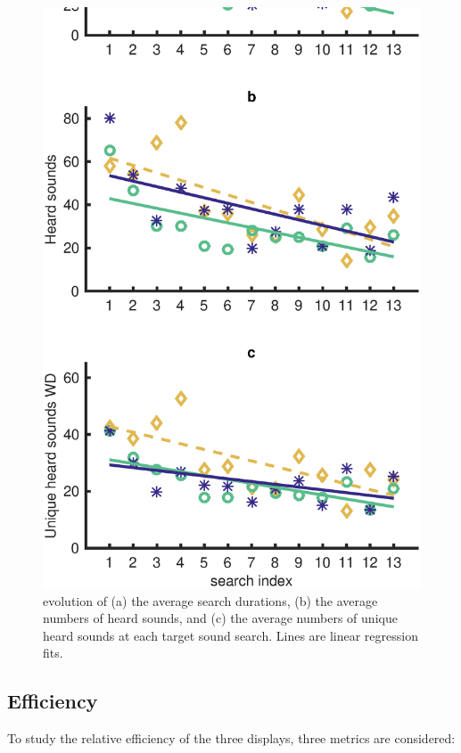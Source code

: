 \documentclass{aes2e}
\begin{document}
\begin{figure}[t]
\begin{center}
\includegraphics[scale=0.4]{gfx/analyse2.eps} 
\end{center}
\caption{\label{fig2} evolution of (a) the average search durations, (b) the average numbers of heard sounds, and (c) the average numbers of unique heard sounds at each target sound search. Lines are linear regression fits.}
\end{figure}


\subsection{Efficiency}

To study the relative efficiency of the three displays, three metrics are considered: 
\end{document}
